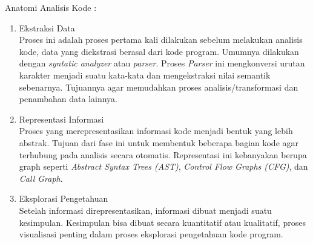 Anatomi Analisis Kode \cite{9}:
\begin{enumerate}[leftmargin=1.3cm]
	\item Ekstraksi Data\\
	Proses ini adalah proses pertama kali dilakukan sebelum melakukan analisis kode, data yang diekstrasi berasal dari kode program. Umumnya dilakukan dengan \textit{syntatic analyzer} atau \textit{parser}. Proses \textit{Parser} ini mengkonversi urutan karakter menjadi suatu kata-kata dan mengekstraksi nilai semantik sebenarnya. Tujuannya agar memudahkan proses analisis/transformasi dan penambahan data lainnya.
	\item Representasi Informasi\\
	Proses yang merepresentasikan informasi kode menjadi bentuk yang lebih abstrak. Tujuan dari fase ini untuk membentuk beberapa bagian kode agar terhubung pada analisis secara otomatis. Representasi ini kebanyakan berupa graph seperti \textit{Abstract Syntax Trees (AST)}, \textit{Control Flow Graphs (CFG)}, dan \textit{Call Graph}.
	\item Eksplorasi Pengetahuan\\
	Setelah informasi direpresentasikan, informasi dibuat menjadi suatu kesimpulan. Kesimpulan bisa dibuat secara kuantitatif atau kualitatif, proses visualisasi penting dalam proses eksplorasi pengetahuan kode program.
\end{enumerate}

